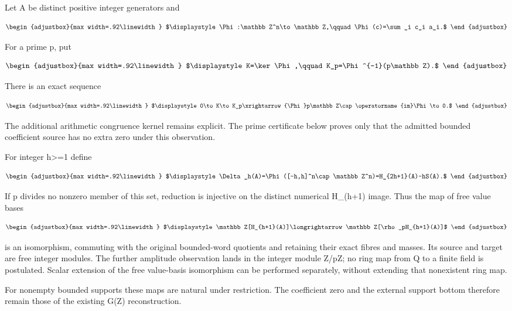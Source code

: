 Let A be distinct positive integer generators and

\[
\begin{adjustbox}{max width=.92\linewidth}
$\displaystyle \Phi:\mathbb Z^n\to\mathbb Z,\qquad \Phi(c)=\sum_i c_i a_i.$
\end{adjustbox}
\]

For a prime p, put

\[
\begin{adjustbox}{max width=.92\linewidth}
$\displaystyle K=\ker\Phi,\qquad K_p=\Phi^{-1}(p\mathbb Z).$
\end{adjustbox}
\]

There is an exact sequence

\[
\begin{adjustbox}{max width=.92\linewidth}
$\displaystyle 0\to K\to K_p\xrightarrow{\Phi}p\mathbb Z\cap\operatorname{im}\Phi\to0.$
\end{adjustbox}
\]

The additional arithmetic congruence kernel remains explicit. The prime certificate below proves only that the admitted bounded coefficient source has no extra zero under this observation.

For integer h\textgreater=1 define

\[
\begin{adjustbox}{max width=.92\linewidth}
$\displaystyle \Delta_h(A)=\Phi([-h,h]^n\cap\mathbb Z^n)=H_{2h+1}(A)-hS(A).$
\end{adjustbox}
\]

If p divides no nonzero member of this set, reduction is injective on the distinct numerical H\_(h+1) image. Thus the map of free value bases

\[
\begin{adjustbox}{max width=.92\linewidth}
$\displaystyle \mathbb Z[H_{h+1}(A)]\longrightarrow
\mathbb Z[\rho_pH_{h+1}(A)]$
\end{adjustbox}
\]

is an isomorphism, commuting with the original bounded-word quotients and retaining their exact fibres and masses. Its source and target are free integer modules. The further amplitude observation lands in the integer module Z/pZ; no ring map from Q to a finite field is postulated. Scalar extension of the free value-basis isomorphism can be performed separately, without extending that nonexistent ring map.

For nonempty bounded supports these maps are natural under restriction. The coefficient zero and the external support bottom therefore remain those of the existing G(Z) reconstruction.

